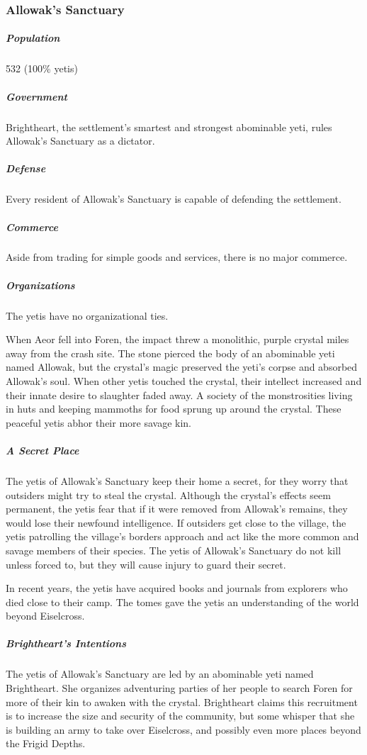 \documentclass[10pt,a4paper,twoside,bg=print,twocolumn,openany,nodeprecatedcode]{dndbook}
\begin{document}
\subsubsection{Allowak's Sanctuary}
\subparagraph{Population}
532 (100\% yetis)

\subparagraph{Government}
Brightheart, the settlement's smartest and strongest abominable yeti, rules Allowak's Sanctuary as a dictator.

\subparagraph{Defense}
Every resident of Allowak's Sanctuary is capable of defending the settlement.

\subparagraph{Commerce}
Aside from trading for simple goods and services, there is no major commerce.

\subparagraph{Organizations}
The yetis have no organizational ties.

When Aeor fell into Foren, the impact threw a monolithic, purple crystal miles away from the crash site. The stone pierced the body of an abominable yeti named Allowak, but the crystal's magic preserved the yeti's corpse and absorbed Allowak's soul. When other yetis touched the crystal, their intellect increased and their innate desire to slaughter faded away. A society of the monstrosities living in huts and keeping mammoths for food sprung up around the crystal. These peaceful yetis abhor their more savage kin.

\subparagraph{A Secret Place}
The yetis of Allowak's Sanctuary keep their home a secret, for they worry that outsiders might try to steal the crystal. Although the crystal's effects seem permanent, the yetis fear that if it were removed from Allowak's remains, they would lose their newfound intelligence. If outsiders get close to the village, the yetis patrolling the village's borders approach and act like the more common and savage members of their species. The yetis of Allowak's Sanctuary do not kill unless forced to, but they will cause injury to guard their secret.

In recent years, the yetis have acquired books and journals from explorers who died close to their camp. The tomes gave the yetis an understanding of the world beyond Eiselcross.

\subparagraph{Brightheart's Intentions}
The yetis of Allowak's Sanctuary are led by an abominable yeti named Brightheart. She organizes adventuring parties of her people to search Foren for more of their kin to awaken with the crystal. Brightheart claims this recruitment is to increase the size and security of the community, but some whisper that she is building an army to take over Eiselcross, and possibly even more places beyond the Frigid Depths.
\end{document}

